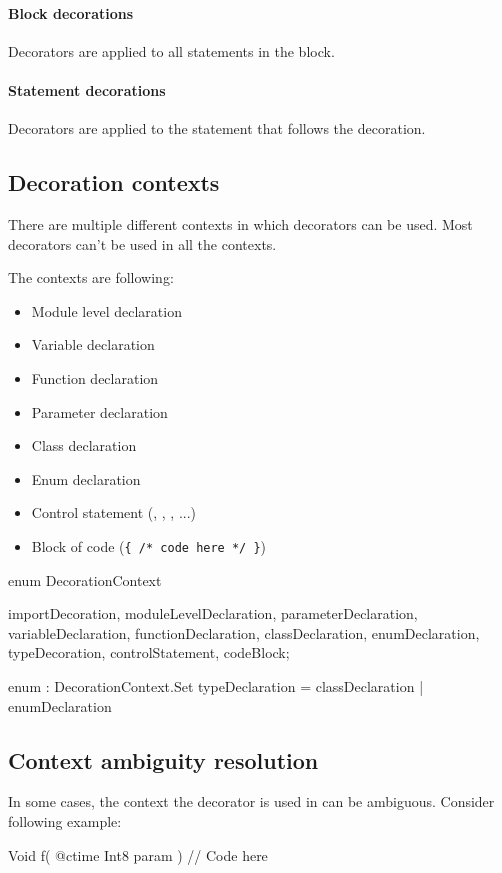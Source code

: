 \paragraph{Block decorations} Decorators are applied to all statements in the block.

\paragraph{Statement decorations} Decorators are applied to the statement that follows the decoration.

\subsection{Decoration contexts} \label{decorationContexts}
There are multiple different contexts in which decorators can be used. Most decorators can't be used in all the contexts.

The contexts are following:
\begin{itemize}
	\item Module level declaration
	\item Variable declaration
	\item Function declaration
	\item Parameter declaration
	\item Class declaration
	\item Enum declaration
	\item Control statement (, , , ...)
	\item Block of code (\verb|{ /* code here */ }|)
\end{itemize}

\begin{code}
enum DecorationContext {
	importDecoration,
	moduleLevelDeclaration,
	parameterDeclaration,
	variableDeclaration,
	functionDeclaration,
	classDeclaration,
	enumDeclaration,
	typeDecoration,
	controlStatement,
	codeBlock;
	
	enum : DecorationContext.Set {
		typeDeclaration = classDeclaration | enumDeclaration	
	}
}
\end{code} \label{enum:DecorationContext}

\subsection{Context ambiguity resolution} In some cases, the context the decorator is used in can be ambiguous. Consider following example:
\begin{code}
Void f( @ctime Int8 param ) {
	// Code here
}
\end{code}

